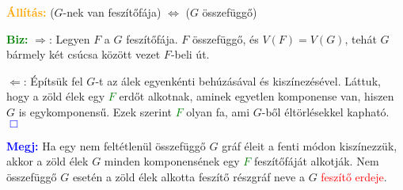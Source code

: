 \documentclass[../szamtud.tex]{subfiles}
\begin{document}
        \textcolor{orange}{\textbf{Állítás:}} ($G$-nek van feszítőfája) $\Longleftrightarrow$ ($G$ összefüggő)

        \textcolor{green}{\textbf{Biz:}} $\Rightarrow$: Legyen $F$ a $G$ feszítőfája. $F$ összefüggő, és $V(F)=V(G)$, tehát $G$ bármely két csúcsa között vezet $F$-beli út.

        $\Leftarrow$: Építsük fel $G$-t az álek egyenkénti behúzásával és kiszínezésével. Láttuk, hogy a zöld élek egy \textcolor{green}{$F$} erdőt alkotnak, aminek egyetlen komponense van, hiszen $G$ is egykomponensű. Ezek szerint \textcolor{green}{$F$} olyan fa, ami $G$-ből éltörlésekkel kapható. \textcolor{blue}{$\Box$}

        \textcolor{blue}{\textbf{Megj:}} Ha egy nem feltétlenül összefüggő $G$ gráf éleit a fenti módon kiszínezzük, akkor a zöld élek $G$ minden komponensének egy \textcolor{green}{$F$} feszítőfáját alkotják. Nem összefüggő $G$ esetén a zöld élek alkotta feszítő részgráf neve a $G$ \textcolor{red}{feszítő erdeje}.
\end{document}

